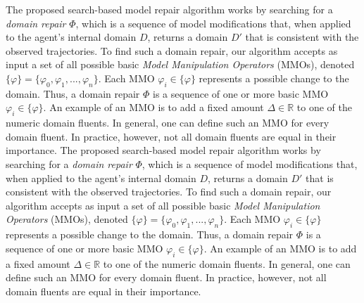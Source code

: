 \documentclass[letterpaper]{article} %
\begin{document}
The proposed search-based model repair algorithm works by searching for a \emph{domain repair} $\varPhi$, which is a sequence of model modifications that, when applied to the agent's internal domain $D$, returns a domain $D'$ that is consistent with the observed trajectories.
To find such a domain repair, our algorithm accepts as input a set of all possible basic \emph{Model Manipulation Operators} (MMOs), denoted $\{\varphi\} = \{\varphi_0, \varphi_1, ... , \varphi_n\}$. Each MMO $\varphi_i \in \{\varphi\}$ represents a possible change to the domain. Thus, a domain repair $\varPhi$ is a sequence of one or more basic MMO $\varphi_i \in \{\varphi\}$. An example of an MMO is to add a fixed amount $\Delta\in\mathbb{R}$ to one of the numeric domain fluents.
In general, one can define such an MMO for every domain fluent. In practice, however, not all domain fluents are equal in their importance. 
The proposed search-based model repair algorithm works by searching for a \emph{domain repair} $\varPhi$, which is a sequence of model modifications that, when applied to the agent's internal domain $D$, returns a domain $D'$ that is consistent with the observed trajectories.
To find such a domain repair, our algorithm accepts as input a set of all possible basic \emph{Model Manipulation Operators} (MMOs), denoted $\{\varphi\} = \{\varphi_0, \varphi_1, ... , \varphi_n\}$. Each MMO $\varphi_i \in \{\varphi\}$ represents a possible change to the domain. Thus, a domain repair $\varPhi$ is a sequence of one or more basic MMO $\varphi_i \in \{\varphi\}$. An example of an MMO is to add a fixed amount $\Delta\in\mathbb{R}$ to one of the numeric domain fluents.
In general, one can define such an MMO for every domain fluent. In practice, however, not all domain fluents are equal in their importance. 
\end{document}
